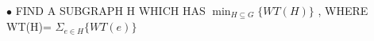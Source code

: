 \documentclass[preview]{standalone}
\begin{document}
\begin{center}
$\bullet$ FIND   A   SUBGRAPH   H  WHICH   HAS $\min_{\scriptscriptstyle H \subseteq G} \{ WT(H) \}$ ,  WHERE   WT(H)= $\Sigma_{e \in H} \{ WT(e) \}$
\end{center}
\end{document}
